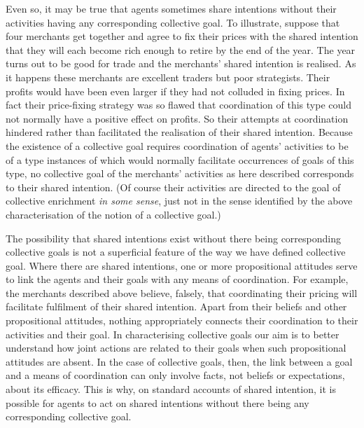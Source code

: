 \documentclass[12pt,a4paper]{extarticle}
\begin{document}
Even so, it may be true that agents sometimes share intentions without their activities having any corresponding collective goal.  To illustrate, suppose that four merchants get together and agree to fix their prices with the shared intention that they will each become rich enough to retire by the end of the year.  
The year turns out to be good for trade and the merchants'  shared intention is realised.
As it happens these merchants are excellent traders but poor strategists.
Their profits would have been even larger if they had not colluded in fixing prices.
In fact their price-fixing strategy was so flawed that coordination of this type could not normally have a positive effect on profits.
So their attempts at coordination hindered rather than facilitated the realisation of their shared intention.  
Because the existence of a collective goal requires coordination of agents' activities to be of a type instances of which would normally facilitate occurrences of  goals of this type, no collective goal of the merchants' activities as here described corresponds to their shared intention.
(Of course their activities are directed to the goal of collective enrichment \emph{in some sense}, just not in the sense identified by the above characterisation of the notion of a collective goal.)

The possibility that shared intentions exist without there being corresponding collective goals is not a superficial feature of the way we have defined collective goal.  
Where there are shared intentions, one or more propositional attitudes serve to link the agents and their goals with any  means of coordination.  
For example, the merchants described above believe, falsely, that coordinating their pricing will facilitate fulfilment of their shared intention.  
Apart from their beliefs and other propositional attitudes, nothing appropriately connects their coordination to their activities and their goal.
In characterising collective goals our aim is to better understand how joint actions are related to their goals when such propositional attitudes are absent.  
In the case of collective goals, then, the link between a goal and a means of coordination can only involve facts, not beliefs or expectations, about its efficacy.
This is why, on standard accounts of shared intention, it is possible for agents to act on shared intentions without there being any corresponding collective goal.  
\end{document}
